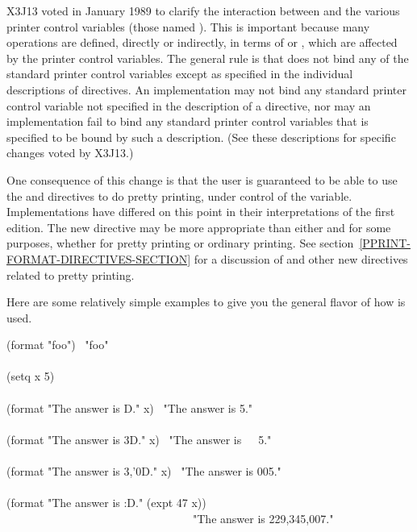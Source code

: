 \begin{new}
X3J13 voted in January 1989
to clarify the interaction between 
and the various printer control variables (those named ).
This is important because many  operations are defined, directly
or indirectly, in terms of  or , which are affected
by the printer control variables.  The general rule is that 
does not bind any of the standard printer control variables except as
specified in the individual descriptions of directives.  An implementation
may not bind any standard printer control variable not specified in the
description of a  directive, nor may an implementation fail
to bind any standard printer control variables that is specified to be bound
by such a description.  (See these
descriptions for specific changes voted by X3J13.)

One consequence of this change is that the user is guaranteed to be able
to use the   and  directives
to do pretty printing, under control of the  variable.
Implementations have differed on this point in their interpretations of
the first edition.  The new  directive may be more appropriate
than either  and  for some purposes,
whether for pretty printing or ordinary printing.
See section~\ref{PPRINT-FORMAT-DIRECTIVES-SECTION} for a discussion of
 and other new  directives related to pretty printing.
\end{new}


Here are some relatively simple examples to give you the general
flavor of how  is used.
\begin{lisp}
(format {\false} "foo") \EV\ "foo" \\
 \\
(setq x 5) \\
 \\
(format {\false} "The answer is {\Xtilde}D." x) \EV\ "The answer is 5." \\
 \\
(format {\false} "The answer is {\Xtilde}3D." x) \EV\ "The answer is~~~5." \\
 \\
(format {\false} "The answer is {\Xtilde}3,'0D." x) \EV\ "The answer is 005." \\
 \\
(format {\false} "The answer is {\Xtilde}:D." (expt 47 x)) \\
~~~~~~~~~~~~~~~~~~~~~~~~~~~~~~~~\EV\ "The answer is 229,345,007."
\end{lisp}

